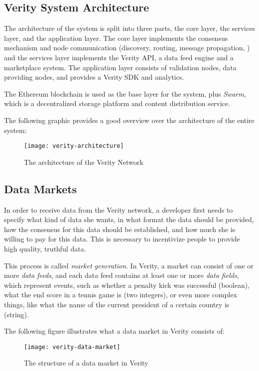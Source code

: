 \subsection*{Verity System Architecture}

The architecture of the system is split into three parts, the core layer, the services layer, and the application layer. The core layer implements the consensus mechanism and node communication (discovery, routing, message propagation, \etc) and the services layer implements the Verity API, a data feed engine and a marketplace system. The application layer consists of validation nodes, data providing nodes, and provides a Verity SDK and analytics.

The Ethereum blockchain is used as the base layer for the system, plus \emph{Swarm}, which is a decentralized storage platform and content distribution service\cite{swarm-homepage}.

The following graphic provides a good overview over the architecture of the entire system:
\begin{figure}[H]
\centering
\texttt{[image: verity-architecture]}
\caption{The architecture of the Verity Network\cite{veritywhitepaper}}
\end{figure}

\newpage

\subsection*{Data Markets}
In order to receive data from the Verity network, a developer first needs to specify what kind of data she wants, in what format the data should be provided, how the consensus for this data should be established, and how much she is willing to pay for this data\cite{veritywhitepaper}. This is necessary to incentivize people to provide high quality, truthful data.

This process is called \emph{market generation}. In Verity, a market can consist of one or more \emph{data feeds}, and each data feed contains at least one or more \emph{data fields}, which represent events, such as whether a penalty kick was successful (boolean), what the end score in a tennis game is (two integers), or even more complex things, like what the name of the current president of a certain country is (string).

The following figure illustrates what a data market in Verity consists of:
\begin{figure}[H]
\centering
\texttt{[image: verity-data-market]}
\caption{The structure of a data market in Verity}
\end{figure}

